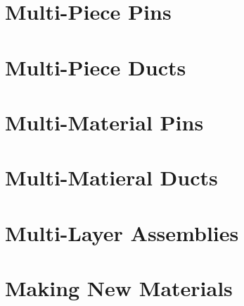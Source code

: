 \section{Multi-Piece Pins}
\section{Multi-Piece Ducts}
\section{Multi-Material Pins}
\section{Multi-Matieral Ducts}
\section{Multi-Layer Assemblies}
\section{Making New Materials}